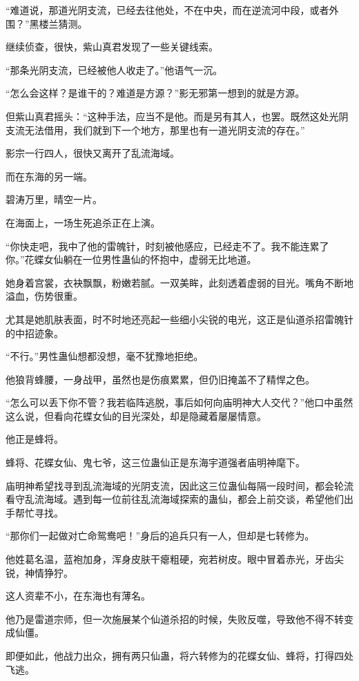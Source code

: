 \begin{this_body}
“难道说，那道光阴支流，已经去往他处，不在中央，而在逆流河中段，或者外围？”黑楼兰猜测。

继续侦查，很快，紫山真君发现了一些关键线索。

“那条光阴支流，已经被他人收走了。”他语气一沉。

“怎么会这样？是谁干的？难道是方源？”影无邪第一想到的就是方源。

但紫山真君摇头：“这种手法，应当不是他。而是另有其人，也罢。既然这处光阴支流无法借用，我们就到下一个地方，那里也有一道光阴支流的存在。”

影宗一行四人，很快又离开了乱流海域。

而在东海的另一端。

碧涛万里，晴空一片。

在海面上，一场生死追杀正在上演。

“你快走吧，我中了他的雷魄针，时刻被他感应，已经走不了。我不能连累了你。”花蝶女仙躺在一位男性蛊仙的怀抱中，虚弱无比地道。

她身着宫裳，衣袂飘飘，粉嫩若腻。一双美眸，此刻透着虚弱的目光。嘴角不断地溢血，伤势很重。

尤其是她肌肤表面，时不时地还亮起一些细小尖锐的电光，这正是仙道杀招雷魄针的中招迹象。

“不行。”男性蛊仙想都没想，毫不犹豫地拒绝。

他狼背蜂腰，一身战甲，虽然也是伤痕累累，但仍旧掩盖不了精悍之色。

“怎么可以丢下你不管？我若临阵逃脱，事后如何向庙明神大人交代？”他口中虽然这么说，但看向花蝶女仙的目光深处，却是隐藏着屡屡情意。

他正是蜂将。

蜂将、花蝶女仙、鬼七爷，这三位蛊仙正是东海宇道强者庙明神麾下。

庙明神希望找寻到乱流海域的光阴支流，因此这三位蛊仙每隔一段时间，都会轮流看守乱流海域。遇到每一位前往乱流海域探索的蛊仙，都会上前交谈，希望他们出手帮忙寻找。

“那你们一起做对亡命鸳鸯吧！”身后的追兵只有一人，但却是七转修为。

他姓葛名温，蓝袍加身，浑身皮肤干瘪粗硬，宛若树皮。眼中冒着赤光，牙齿尖锐，神情狰狞。

这人资辈不小，在东海也有薄名。

他乃是雷道宗师，但一次施展某个仙道杀招的时候，失败反噬，导致他不得不转变成仙僵。

即便如此，他战力出众，拥有两只仙蛊，将六转修为的花蝶女仙、蜂将，打得四处飞逃。


\end{this_body}
